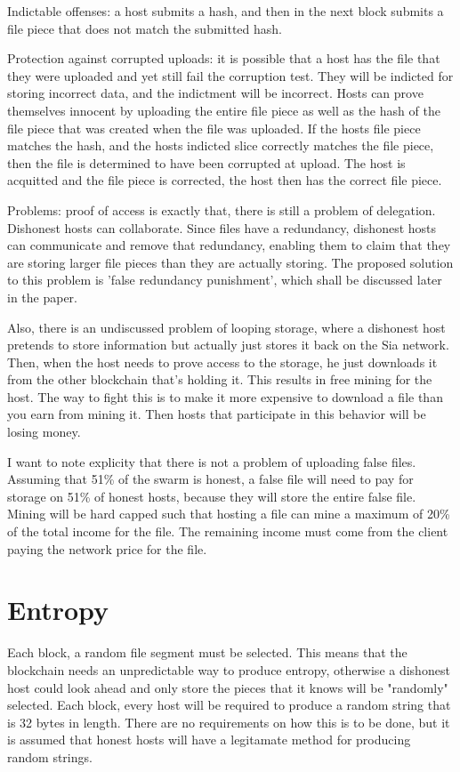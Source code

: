 \documentclass[twocolumn]{article}
\begin{document}
Indictable offenses: a host submits a hash, and then in the next block submits a file piece that does not match the submitted hash.

Protection against corrupted uploads: it is possible that a host has the file that they were uploaded and yet still fail the corruption test.
They will be indicted for storing incorrect data, and the indictment will be incorrect.
Hosts can prove themselves innocent by uploading the entire file piece as well as the hash of the file piece that was created when the file was uploaded.
If the hosts file piece matches the hash, and the hosts indicted slice correctly matches the file piece, then the file is determined to have been corrupted at upload.
The host is acquitted and the file piece is corrected, the host then has the correct file piece.

Problems: proof of access is exactly that, there is still a problem of delegation.
Dishonest hosts can collaborate.
Since files have a redundancy, dishonest hosts can communicate and remove that redundancy, enabling them to claim that they are storing larger file pieces than they are actually storing.
The proposed solution to this problem is 'false redundancy punishment', which shall be discussed later in the paper.

Also, there is an undiscussed problem of looping storage, where a dishonest host pretends to store information but actually just stores it back on the Sia network. Then, when the host needs to prove access to the storage, he just downloads it from the other blockchain that's holding it. This results in free mining for the host. The way to fight this is to make it more expensive to download a file than you earn from mining it. Then hosts that participate in this behavior will be losing money.

I want to note explicity that there is not a problem of uploading false files.
Assuming that 51\% of the swarm is honest, a false file will need to pay for storage on 51\% of honest hosts, because they will store the entire false file.
Mining will be hard capped such that hosting a file can mine a maximum of 20\% of the total income for the file.
The remaining income must come from the client paying the network price for the file.

\section{Entropy}

Each block, a random file segment must be selected.
This means that the blockchain needs an unpredictable way to produce entropy, otherwise a dishonest host could look ahead and only store the pieces that it knows will be "randomly" selected.
Each block, every host will be required to produce a random string that is 32 bytes in length.
There are no requirements on how this is to be done, but it is assumed that honest hosts will have a legitamate method for producing random strings.
\end{document}
